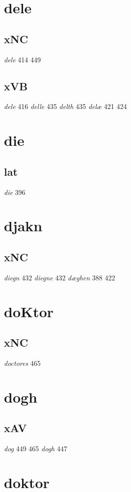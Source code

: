 \documentclass[a4paper,twocolumn]{article}
\begin{document}
\section{dele}
\label{sec:orgb528f53}
\subsection{xNC}
\label{sec:org1592ce3}
\emph{dele} 414 449 
\subsection{xVB}
\label{sec:org687e7b3}
\emph{dele} 416 \emph{delle} 435 \emph{delth} 435 \emph{delæ} 421 424 
\section{die}
\label{sec:org22f5393}
\subsection{lat}
\label{sec:org18ce19a}
\emph{die} 396 
\section{djakn}
\label{sec:orgc591c80}
\subsection{xNC}
\label{sec:org11476ea}
\emph{diegn} 432 \emph{diegne} 432 \emph{dæghen} 388 422 
\section{doKtor}
\label{sec:org15d42e4}
\subsection{xNC}
\label{sec:org4d618f4}
\emph{doctores} 465 
\section{dogh}
\label{sec:org9bbfdb4}
\subsection{xAV}
\label{sec:org80d6e98}
\emph{dog} 449 465 \emph{dogh} 447 
\section{doktor}
\label{sec:org8aa4ca6}
\end{document}

